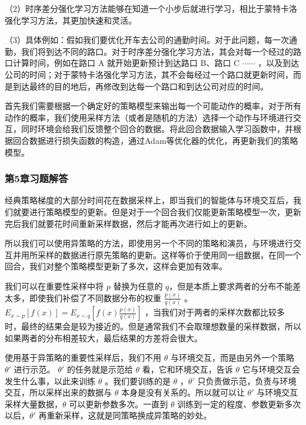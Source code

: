 （2）时序差分强化学习方法能够在知道一个小步后就进行学习，相比于蒙特卡洛强化学习方法，其更加快速和灵活。

（3）具体例如：假如我们要优化开车去公司的通勤时间。对于此问题，每一次通勤，我们将到达不同的路口。对于时序差分强化学习方法，其会对每一个经过的路口计算时间，例如在路口 A 就开始更新预计到达路口 B、路口 C $\cdots \cdots$ ，以及到达公司的时间；对于蒙特卡洛强化学习方法，其不会每经过一个路口就更新时间，而是到达最终的目的地后，再修改到达每一个路口和到达公司对应的时间。


首先我们需要根据一个确定好的策略模型来输出每一个可能动作的概率，对于所有动作的概率，我们使用采样方法（或者是随机的方法）选择一个动作与环境进行交互，同时环境会给我们反馈整个回合的数据。将此回合数据输入学习函数中，并根据回合数据进行损失函数的构造，通过Adam等优化器的优化，再更新我们的策略模型。



\subsubsection*{第5章习题解答}


经典策略梯度的大部分时间花在数据采样上，即当我们的智能体与环境交互后，我们就要进行策略模型的更新。但是对于一个回合我们仅能更新策略模型一次，更新完后我们就要花时间重新采样数据，然后才能再次进行如上的更新。

所以我们可以使用异策略的方法，即使用另一个不同的策略和演员，与环境进行交互并用所采样的数据进行原先策略的更新。这样等价于使用同一组数据，在同一个回合，我们对整个策略模型更新了多次，这样会更加有效率。


我们可以在重要性采样中将 $p$ 替换为任意的 $q$，但是本质上要求两者的分布不能差太多，即使我们补偿了不同数据分布的权重 $\frac{p(x)}{q(x)}$ 。 $E_{x \sim p}[f(x)]=E_{x \sim q}\left[f(x) \frac{p(x)}{q(x)}\right]$ ，当我们对于两者的采样次数都比较多时，最终的结果会是较为接近的。但是通常我们不会取理想数量的采样数据，所以如果两者的分布相差较大，最后结果的方差将会很大。


使用基于异策略的重要性采样后，我们不用 $\theta$ 与环境交互，而是由另外一个策略 $\theta'$ 进行示范。 $\theta'$ 的任务就是示范给 $\theta$ 看，它和环境交互，告诉 $\theta$ 它与环境交互会发生什么事，以此来训练 $\theta$ 。我们要训练的是 $\theta$ ，$\theta'$ 只负责做示范，负责与环境交互，所以采样出来的数据与 $\theta$ 本身是没有关系的。所以就可以让 $\theta'$ 与环境交互采样大量数据，$\theta$ 可以更新参数多次。一直到 $\theta$ 训练到一定的程度、参数更新多次以后，$\theta'$ 再重新采样，这就是同策略换成异策略的妙处。

